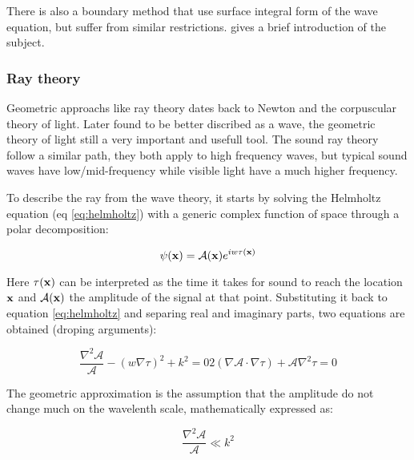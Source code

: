 There is also a boundary method that use surface integral form of the wave
equation, but suffer from similar restrictions. \citet{funkhouser2003survey}
gives a brief introduction of the subject.

\subsubsection{Ray theory}

Geometric approachs like ray theory dates back to Newton and the corpuscular
theory of light. Later found to be better discribed as a wave, the geometric
theory of light still a very important and usefull tool. The sound ray theory
follow a similar path, they both apply to high frequency waves, but typical
sound waves have low/mid-frequency while visible light have a much higher
frequency.

To describe the ray from the wave theory, it starts by solving the Helmholtz
equation (eq \ref{eq:helmholtz}) with a generic complex function of space
through a polar decomposition\cite{buckingham1992ocean,torres2007modeling}:

\[ \psi(\mathrm{\mathbf{x}}) = \mathcal{A}(\mathrm{\mathbf{x}})e^{iw\tau(\mathrm{\mathbf{x}})} \]

Here $\tau(\mathrm{\mathbf{x}})$ can be interpreted as the time it takes for sound to
reach the location $\mathrm{\mathbf{x}}$ and $\mathcal{A}(\mathrm{\mathbf{x}})$ the amplitude of the
signal at that point. Substituting it back to equation \ref{eq:helmholtz} and
separing real and imaginary parts, two equations are obtained (droping
arguments):

\begin{subequations}
\begin{equation}
\label{eq:preeikonal}
\frac{\nabla^2\mathcal{A}}{\mathcal{A}} - (w\nabla \tau)^2 + k^2 = 0
\end{equation}

\begin{equation}
\label{eq:preeikonalamp}
2(\nabla\mathcal{A} \cdot \nabla \tau) + \mathcal{A}\nabla^2 \tau = 0
\end{equation}
\end{subequations}

The geometric approximation is the assumption that the amplitude do not change
much on the wavelenth scale, mathematically expressed as:

\begin{equation}
\label{eq:highfrequency}
\frac{\nabla^2\mathcal{A}}{\mathcal{A}} \ll k^2
\end{equation}

